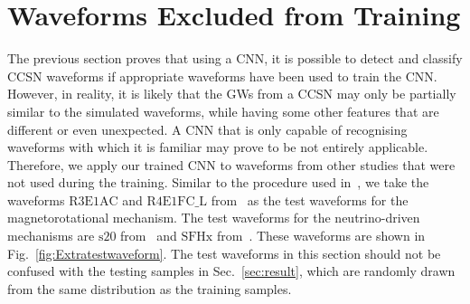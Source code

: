 \documentclass[aps,twocolumn,showpacs,groupedaddress, nofootinbib]{revtex4}  %
\begin{document}
\section{Waveforms Excluded from Training}\label{sec:unseen}
%
%
The previous section proves that using a \ac{CNN}, it is possible to detect and
classify \ac{CCSN} waveforms if appropriate waveforms have been used to train
the \ac{CNN}. However, in reality, it is likely that the \acp{GW} from a
\ac{CCSN} may only be partially similar to the simulated waveforms, while
having some other features that are different or even unexpected. A \ac{CNN}
that is only capable of recognising waveforms with which it is familiar may
prove to be not entirely applicable. Therefore, we apply our trained
\ac{CNN} to waveforms from other studies that were not used during the
training. Similar to the procedure used in~\cite{roma2019astrophysics}, we take
the waveforms $\text{R3E1AC}$ and $\text{R4E1FC\_L}$
from~\cite{scheidegger2010influence} as the test waveforms for the
magnetorotational mechanism. The test waveforms for the neutrino-driven
mechanisms are $\text{s}20$ from~\cite{andresen2017gravitational} and
$\text{SFHx}$ from~\cite{kuroda2016new}. These waveforms are shown
in Fig.~\ref{fig:Extratestwaveform}. The test waveforms in this section should
not be confused with the testing samples in Sec.~\ref{sec:result}, which are
randomly drawn from the same distribution as the training samples.
\end{document}
